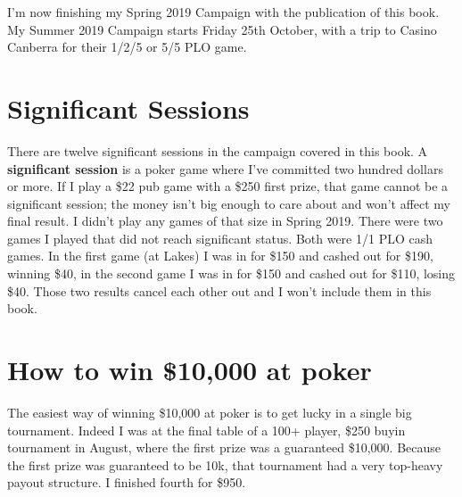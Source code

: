 I'm now finishing my Spring 2019 Campaign with the publication of this
book. My Summer 2019 Campaign starts Friday 25th October, with a trip
to Casino Canberra for their 1/2/5 or 5/5 PLO game.

\section*{Significant Sessions}


There are twelve significant sessions in the campaign covered in this
book. A \textbf{significant session} is a poker game where I've
committed two hundred dollars or more. If I play a \$22 pub game with
a \$250 first prize, that game cannot be a significant session; the
money isn't big enough to care about and won't affect my final
result. I didn't play any games of that size in Spring 2019. There
were two games I played that did not reach significant status. Both
were 1/1 PLO cash games. In the first game (at Lakes) I was in for
\$150 and cashed out for \$190, winning \$40, in the second game I was
in for \$150 and cashed out for \$110, losing \$40. Those two results
cancel each other out and I won't include them in this book.


\section{How to win \$10,000 at poker}

The easiest way of winning \$10,000 at poker is to get lucky in a
single big tournament. Indeed I was at the final table of a 100+
player, \$250 buyin tournament in August, where the first prize was a
guaranteed \$10,000. Because the first prize was guaranteed to be 10k,
that tournament had a very top-heavy payout structure. I finished
fourth for \$950.







